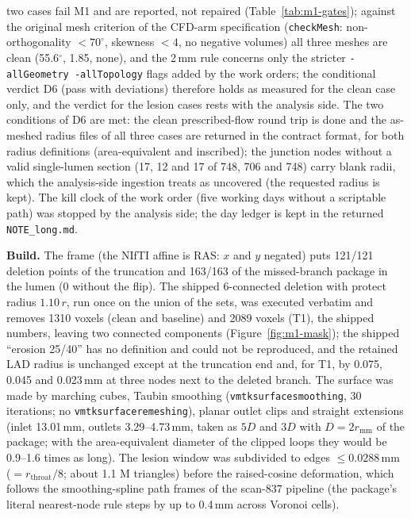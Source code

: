 \documentclass[11pt]{article}
\begin{document}
two cases fail M1 and are reported, not repaired (Table~\ref{tab:m1-gates}); against the original mesh criterion of the CFD-arm specification (\texttt{checkMesh}: non-orthogonality $<70^\circ$, skewness $<4$, no negative volumes) all three meshes are clean (55.6$^\circ$, 1.85, none), and the 2\,mm rule concerns only the stricter \texttt{-allGeometry -allTopology} flags added by the work orders; the conditional verdict D6 (pass with deviations) therefore holds as measured for the clean case only, and the verdict for the lesion cases rests with the analysis side. The two conditions of D6 are met: the clean prescribed-flow round trip is done and the as-meshed radius files of all three cases are returned in the contract format, for both radius definitions (area-equivalent and inscribed); the junction nodes without a valid single-lumen section (17, 12 and 17 of 748, 706 and 748) carry blank radii, which the analysis-side ingestion treats as uncovered (the requested radius is kept). The kill clock of the work order (five working days without a scriptable path) was stopped by the analysis side; the day ledger is kept in the returned \texttt{NOTE\_long.md}.

\textbf{Build.} The frame (the NIfTI affine is RAS: $x$ and $y$ negated) puts 121/121 deletion points of the truncation and 163/163 of the missed-branch package in the lumen (0 without the flip). The shipped 6-connected deletion with protect radius $1.10\,r$, run once on the union of the sets, was executed verbatim and removes 1310 voxels (clean and baseline) and 2089 voxels (T1), the shipped numbers, leaving two connected components (Figure~\ref{fig:m1-mask}); the shipped ``erosion 25/40'' has no definition and could not be reproduced, and the retained LAD radius is unchanged except at the truncation end and, for T1, by 0.075, 0.045 and 0.023\,mm at three nodes next to the deleted branch. The surface was made by marching cubes, Taubin smoothing (\texttt{vmtksurfacesmoothing}, 30 iterations; no \texttt{vmtksurfaceremeshing}), planar outlet clips and straight extensions (inlet 13.01\,mm, outlets 3.29--4.73\,mm, taken as $5D$ and $3D$ with $D=2r_\text{mm}$ of the package; with the area-equivalent diameter of the clipped loops they would be 0.9--1.6 times as long). The lesion window was subdivided to edges $\leq0.0288$\,mm ($=r_\text{throat}/8$; about 1.1 M triangles) before the raised-cosine deformation, which follows the smoothing-spline path frames of the scan-837 pipeline (the package's literal nearest-node rule steps by up to 0.4\,mm across Voronoi cells).
\end{document}
